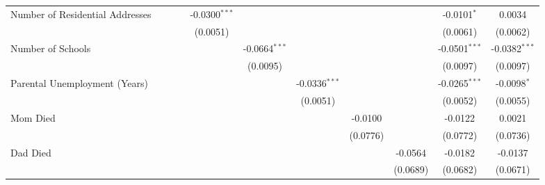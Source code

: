 \begin{tabular}{lcccccccccc}
   Number of Residential Addresses           &                 &                 &                 & -0.0300$^{***}$ &                 &                 &                       &                        & -0.0101$^{*}$   & 0.0034\\   
                                             &                 &                 &                 & (0.0051)        &                 &                 &                       &                        & (0.0061)        & (0.0062)\\   
   Number of Schools                         &                 &                 &                 &                 & -0.0664$^{***}$ &                 &                       &                        & -0.0501$^{***}$ & -0.0382$^{***}$\\   
                                             &                 &                 &                 &                 & (0.0095)        &                 &                       &                        & (0.0097)        & (0.0097)\\   
   Parental Unemployment (Years)             &                 &                 &                 &                 &                 & -0.0336$^{***}$ &                       &                        & -0.0265$^{***}$ & -0.0098$^{*}$\\   
                                             &                 &                 &                 &                 &                 & (0.0051)        &                       &                        & (0.0052)        & (0.0055)\\   
   Mom Died                                  &                 &                 &                 &                 &                 &                 & -0.0100               &                        & -0.0122         & 0.0021\\   
                                             &                 &                 &                 &                 &                 &                 & (0.0776)              &                        & (0.0772)        & (0.0736)\\   
   Dad Died                                  &                 &                 &                 &                 &                 &                 &                       & -0.0564                & -0.0182         & -0.0137\\   
                                             &                 &                 &                 &                 &                 &                 &                       & (0.0689)               & (0.0682)        & (0.0671)\\   

\end{tabular}
